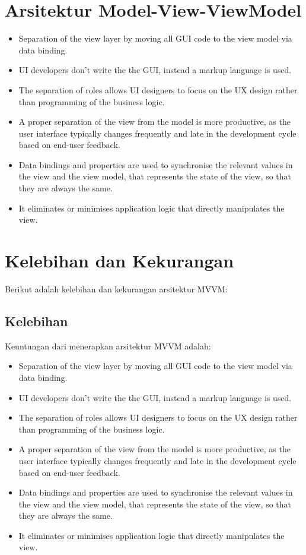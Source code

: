 \section{Arsitektur Model-View-ViewModel}
\begin{itemize}
\item Separation of the view layer by moving all GUI code to the view model via data binding.
\item UI developers don't write the the GUI, instead a markup language is used.
\item The separation of roles allows UI designers to focus on the UX design rather than programming of the business logic. 
\item A proper separation of the view from the model is more productive, as the user interface typically changes frequently and late in the development cycle based on end-user feedback.
\item Data bindings and properties are used to synchronise the relevant values in the view and the view model, that represents the state of the view, so that they are always the same.
\item It eliminates or minimises application logic that directly manipulates the view. 

\end{itemize}



\section{Kelebihan dan Kekurangan}
Berikut adalah kelebihan dan kekurangan arsitektur MVVM:


\subsection{Kelebihan}
Keuntungan dari menerapkan arsitektur MVVM adalah:
\begin{itemize}
\item Separation of the view layer by moving all GUI code to the view model via data binding.
\item UI developers don't write the the GUI, instead a markup language is used.
\item The separation of roles allows UI designers to focus on the UX design rather than programming of the business logic. 
\item A proper separation of the view from the model is more productive, as the user interface typically changes frequently and late in the development cycle based on end-user feedback.
\item Data bindings and properties are used to synchronise the relevant values in the view and the view model, that represents the state of the view, so that they are always the same.
\item It eliminates or minimises application logic that directly manipulates the view. 

\end{itemize}

